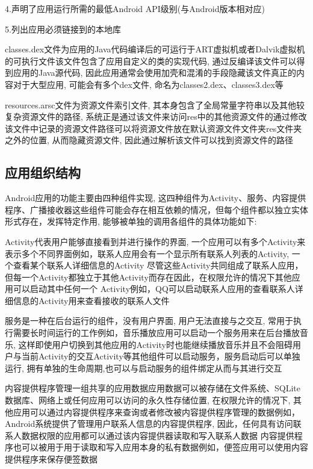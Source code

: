 4.声明了应用运行所需的最低Android API级别(与Android版本相对应)

5.列出应用必须链接到的本地库

classes.dex文件为应用的Java代码编译后的可运行于ART虚拟机或者Dalvik虚拟机的可执行文件\juhao 该文件包含了应用自定义的类的实现代码, 通过反编译该文件可以得到应用的Java源代码, 因此应用通常会使用加壳和混淆的手段隐藏该文件真正的内容\juhao 对于大型应用, 可能会有多个dex文件, 命名为classes2.dex、classes3.dex等\juhao

resources.arsc文件为资源文件索引文件, 其本身包含了全局常量字符串以及其他较复杂资源文件的路径, 系统正是通过该文件来访问res中的其他资源文件的\juhao 通过修改该文件中记录的资源文件路径可以将资源文件放在默认资源文件文件夹res文件夹之外的位置, 从而隐藏资源文件, 因此通过解析该文件可以找到资源文件的路径\juhao

\subsection{应用组织结构}
Android应用的功能主要由四种组件实现, 这四种组件为Activity、服务、内容提供程序、广播接收器\juhao 这些组件可能会存在相互依赖的情况，但每个组件都以独立实体形式存在，发挥特定作用, 能够被单独的调用\juhao 各组件的具体功能如下:

Activity代表用户能够直接看到并进行操作的界面, 一个应用可以有多个Activity来表示多个不同界面\juhao 例如，联系人应用会有一个显示所有联系人列表的Activity, 一个查看某个联系人详细信息的Activity\juhao 
尽管这些Activity共同组成了联系人应用，但每一个Activity都独立于其他Activity而存在\juhao 因此，在权限允许的情况下其他应用可以启动其中任何一个 Activity\juhao 例如，QQ可以启动联系人应用的查看联系人详细信息的Activity用来查看接收的联系人文件\juhao

服务是一种在后台运行的组件，没有用户界面, 用户无法直接与之交互, 常用于执行需要长时间运行的工作\juhao 例如，音乐播放应用可以启动一个服务用来在后台播放音乐, 这样即使用户切换到其他应用的Activity时也能继续播放音乐并且不会阻碍用户与当前Activity的交互\juhao  Activity等其他组件可以启动服务，服务启动后可以单独运行, 拥有单独的生命周期,也可以与启动服务的组件绑定从而与其进行交互\juhao

内容提供程序管理一组共享的应用数据\juhao 应用数据可以被存储在文件系统、SQLite 数据库、网络上或任何应用可以访问的永久性存储位置, 在权限允许的情况下, 其他应用可以通过内容提供程序来查询或者修改被内容提供程序管理的数据\juhao 例如，Android系统提供了管理用户联系人信息的内容提供程序, 因此，任何具有访问联系人数据权限的应用都可以通过该内容提供器读取和写入联系人数据\juhao
内容提供程序也可以被用于用于读取和写入应用本身的私有数据\juhao 例如，便签应用可以使用内容提供程序来保存便签数据\juhao

